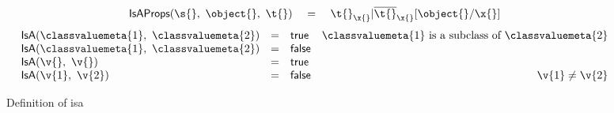 \begin{figure*}
$$
\begin{array}{lclr}

\isacomparealign {\s{}} {\object{}} {\t{}}
                {\replacefor
                  {\filterset {\isprop{\t{}}  {\x{}}}
                              {\notprop{\t{}} {\x{}}}}
                  {\object{}}
                  {\x{}}}
\end{array}
$$
$$
\begin{array}{lclr}
  \isaopsem{\classvaluemeta{1}}{\classvaluemeta{2}} &=& {\true{}} & \classvaluemeta{1}\ \text{is a subclass of}\ \classvaluemeta{2}\\
  \isaopsem{\classvaluemeta{1}}{\classvaluemeta{2}} &=& {\false{}}\\
  \isaopsem{\v{}}{\v{}} &=& {\true{}}\\
  \isaopsem{\v{1}}{\v{2}} &=& {\false{}} & \v{1} \not= \v{2}
\end{array}
$$
\caption{Definition of isa}
\end{figure*}
